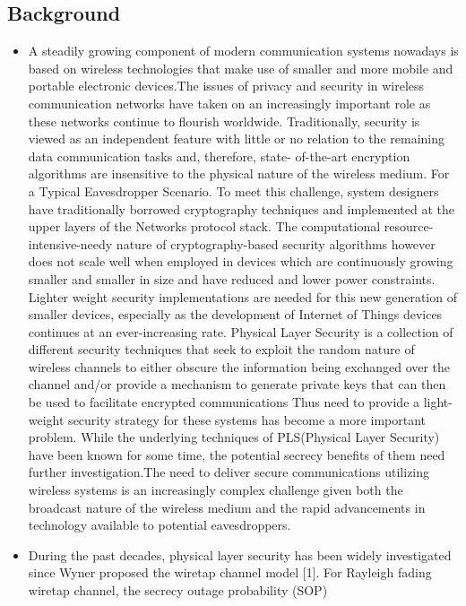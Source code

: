 \documentclass{article}
\begin{document}
\subsection{Background}
\begin{itemize}
    \item 
    A steadily growing component of modern communication systems nowadays is based on wireless technologies that make use of smaller and more mobile and portable electronic devices.The issues of privacy and security in wireless communication
networks have taken on an increasingly important role as these
networks continue to flourish worldwide. Traditionally, security
is viewed as an independent feature with little or no relation to
the remaining data communication tasks and, therefore, state-
of-the-art encryption algorithms are insensitive to the physical
nature of the wireless medium. 
 For a Typical Eavesdropper Scenario. To meet this challenge, system designers have traditionally borrowed cryptography techniques and implemented at the upper layers of the Networks protocol stack. The computational resource-intensive-needy nature of cryptography-based security algorithms however does not scale well when employed in devices which are continuously growing smaller and smaller in size and have reduced and lower power constraints. Lighter weight security implementations are needed for this new generation of smaller devices, especially as the development of Internet of Things devices continues at an ever-increasing rate. Physical Layer Security is a collection of different security techniques that seek to exploit the random nature of wireless channels to either obscure the information being exchanged over the channel and/or provide a mechanism to generate private keys that can then be used to facilitate encrypted communications
    Thus need to provide a light-weight security strategy for these systems has become a more important problem. While the underlying techniques of PLS(Physical Layer Security) have been known for some time, the potential secrecy benefits of them need further investigation.The need to deliver secure communications utilizing wireless systems is an increasingly complex challenge given both the broadcast nature of the wireless medium and the rapid advancements in technology available to potential eavesdroppers. 
\item    
During the past decades,
physical layer security has been widely investigated since
Wyner proposed the wiretap channel model [1]. For Rayleigh
fading wiretap channel, the secrecy outage probability (SOP)

\end{itemize}
\end{document}
